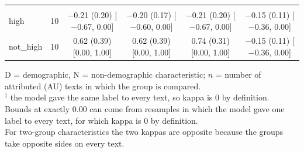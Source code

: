 \begin{table}[t]
\begin{tabular}{@{}lr*{4}{c}@{}}
\addlinespace
\multicolumn{6}{@{}l}{\textit{Religion (N)}} \\
\quad high & 10 & \makecell{$-$0.21 (0.20)\\ {[}$-$0.67, 0.00{]}} & \makecell{$-$0.20 (0.17)\\ {[}$-$0.60, 0.00{]}} & \makecell{$-$0.21 (0.20)\\ {[}$-$0.67, 0.00{]}} & \makecell{$-$0.15 (0.11)\\ {[}$-$0.36, 0.00{]}} \\
\quad not\_high & 10 & \makecell{0.62 (0.39)\\ {[}0.00, 1.00{]}} & \makecell{0.62 (0.39)\\ {[}0.00, 1.00{]}} & \makecell{0.74 (0.31)\\ {[}0.00, 1.00{]}} & \makecell{$-$0.15 (0.11)\\ {[}$-$0.36, 0.00{]}} \\
\bottomrule
\end{tabular}
\par\smallskip
\begin{minipage}{\linewidth}
\footnotesize
D = demographic, N = non-demographic characteristic; $n$ = number of attributed (\ac{AU}) texts in which the group is compared. \\
$^\dagger$ the model gave the same label to every text, so kappa is 0 by definition. \\
Bounds at exactly 0.00 can come from resamples in which the model gave one label to every text, for which kappa is 0 by definition. \\
For two-group characteristics the two kappas are opposite because the groups take opposite sides on every text.
\end{minipage}
\end{table}
